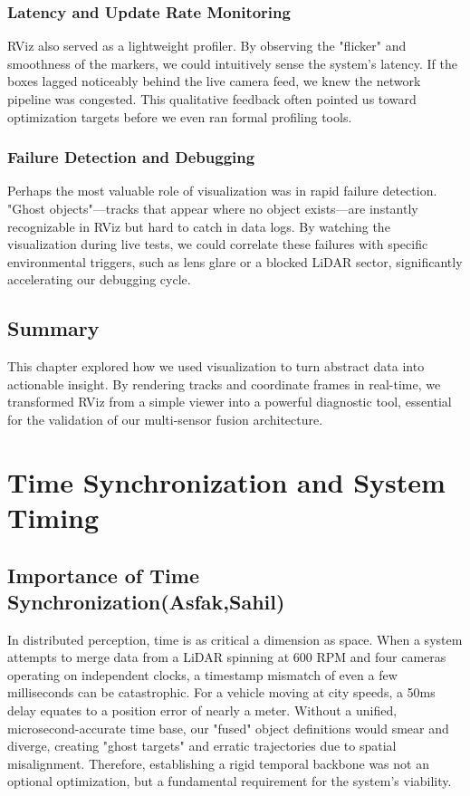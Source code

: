 \documentclass[12pt,a4paper]{report}
\begin{document}
{\subsection{Latency and Update Rate Monitoring}
RViz also served as a lightweight profiler. By observing the "flicker" and smoothness of the markers, we could intuitively sense the system's latency. If the boxes lagged noticeably behind the live camera feed, we knew the network pipeline was congested. This qualitative feedback often pointed us toward optimization targets before we even ran formal profiling tools.

\subsection{Failure Detection and Debugging}
Perhaps the most valuable role of visualization was in rapid failure detection. "Ghost objects"—tracks that appear where no object exists—are instantly recognizable in RViz but hard to catch in data logs. By watching the visualization during live tests, we could correlate these failures with specific environmental triggers, such as lens glare or a blocked LiDAR sector, significantly accelerating our debugging cycle.

\section{Summary}
This chapter explored how we used visualization to turn abstract data into actionable insight. By rendering tracks and coordinate frames in real-time, we transformed RViz from a simple viewer into a powerful diagnostic tool, essential for the validation of our multi-sensor fusion architecture.

\chapter{Time Synchronization and System Timing}

\section{Importance of Time Synchronization(Asfak,Sahil)}
In distributed perception, time is as critical a dimension as space. When a system attempts to merge data from a LiDAR spinning at 600 RPM and four cameras operating on independent clocks, a timestamp mismatch of even a few milliseconds can be catastrophic. For a vehicle moving at city speeds, a 50ms delay equates to a position error of nearly a meter. Without a unified, microsecond-accurate time base, our "fused" object definitions would smear and diverge, creating "ghost targets" and erratic trajectories due to spatial misalignment. Therefore, establishing a rigid temporal backbone was not an optional optimization, but a fundamental requirement for the system's viability.

}
\end{document}
